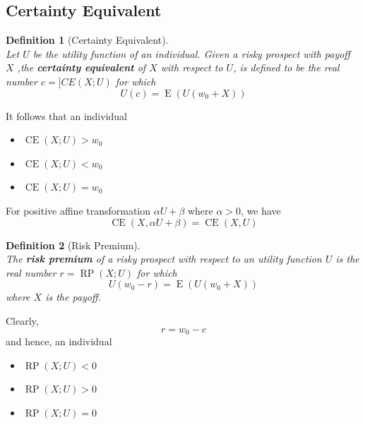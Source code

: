 \documentclass[12pt]{article}
\newtheorem{definition}{Definition}[section]
\theoremstyle{definition}
\DeclareMathOperator{\expec}{E}
\DeclareMathOperator{\CE}{CE}
\DeclareMathOperator{\RP}{RP}
\begin{document}
\subsection{Certainty Equivalent}
\begin{definition}[Certainty Equivalent]
\hfill\\\normalfont Let $U$ be the utility function of an individual. Given a risky prospect with payoff $X$ ,the \textbf{certainty equivalent} of $X$ with respect to $U$, is defined to be the real number $c = ]CE(X;U)$ for which
\[
U(c)=\expec(U(w_0+X))
\]
\end{definition}
It follows that an individual
\begin{itemize}
  \item {}$\CE(X;U)>w_0$
  \item {}$\CE(X;U)<w_0$
  \item {}$\CE(X;U)=w_0$
\end{itemize}
For positive affine transformation $\alpha U+\beta$ where $\alpha>0$, we have
\[
\CE(X, \alpha U+\beta) = \CE(X,U)
\]
\begin{definition}[Risk Premium]
\hfill\\\normalfont The \textbf{risk premium} of a risky prospect with respect to an utility function $U$ is the real number $r=\RP(X;U)$ for which
\[
U(w_0-r) = \expec(U(w_0+X))
\]
where $X$ is the payoff.
\end{definition}
Clearly,
\[
r=w_0-c
\]
and hence, an individual
\begin{itemize}
  \item {}$\RP(X;U)<0$
  \item {}$\RP(X;U)>0$
  \item {}$\RP(X;U)=0$
\end{itemize}
\end{document}
